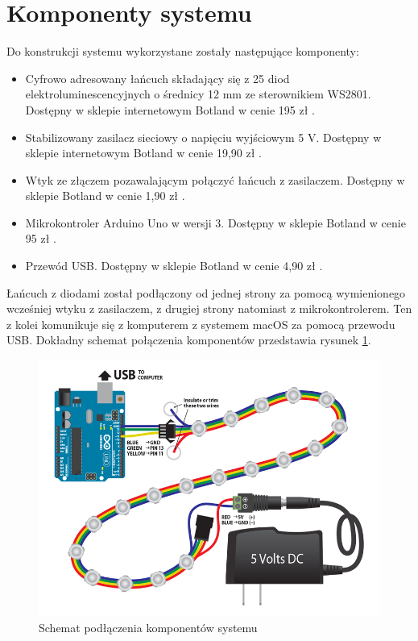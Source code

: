 \documentclass[12pt]{report}
\begin{document}
\section{Komponenty systemu}

Do konstrukcji systemu wykorzystane zostały następujące komponenty:

\begin{itemize}
	\item Cyfrowo adresowany łańcuch składający się z 25 diod elektroluminescencyjnych o średnicy 12 mm ze sterownikiem WS2801. Dostępny w sklepie internetowym Botland w cenie 195 zł \cite{diody}.
	\item Stabilizowany zasilacz sieciowy o napięciu wyjściowym 5 V. Dostępny w sklepie internetowym Botland w cenie 19,90 zł \cite{zasilacz}.
	\item Wtyk ze złączem pozawalającym połączyć łańcuch z zasilaczem. Dostępny w sklepie Botland w cenie 1,90 zł \cite{wtyk}.
	\item Mikrokontroler Arduino Uno w wersji 3. Dostępny w sklepie Botland w cenie 95 zł \cite{arduino}.
	\item Przewód USB. Dostępny w sklepie Botland w cenie 4,90 zł \cite{usb}.
\end{itemize}

Łańcuch z diodami został podłączony od jednej strony za pomocą wymienionego wcześniej wtyku z zasilaczem, z drugiej strony natomiast z mikrokontrolerem. Ten z kolei komunikuje się z komputerem z systemem macOS za pomocą przewodu USB. Dokładny schemat połączenia komponentów przedstawia rysunek \ref{schemat}.
	
\begin{figure}[h]
\centering
\includegraphics[width=\textwidth]{../resources/wiring.png}
\caption[Schemat podłączenia komponentów systemu]{Schemat podłączenia komponentów systemu \cite{schemat}}
\label{schemat}
\end{figure}
		
\end{document}
